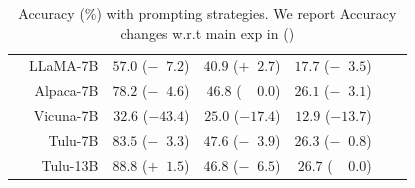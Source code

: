 \documentclass{beamer}
\begin{document}
\begin{frame}
\begin{columns}[t]
\begin{table}
{\begin{tabular}{lrrrrrr}
        & LLaMA-7B            & \cellcolor{'sred'} $57.0$ ($-\;\;7.2$)   & \cellcolor{'sgreen'} $40.9$ ($+\;\;2.7$)   & \cellcolor{'sred'}$17.7$ ($-\;\;3.5$)    \\
        & Alpaca-7B           & \cellcolor{'sred'} $78.2$ ($-\;\;4.6$)   &  $46.8$ ($\;\;\;\;0.0$)                        & \cellcolor{'sred'} $26.1$ ($-\;\;3.1$)    \\
        & Vicuna-7B           & \cellcolor{'sred'} $32.6$ ($-43.4$)  & \cellcolor{'sred'} $25.0$ ($-17.4$)    & \cellcolor{'sred'} $12.9$ ($-13.7$)       \\
        & Tulu-7B             & \cellcolor{'sred'} $83.5$ ($-\;\;3.3$)   & \cellcolor{'sred'} $47.6$ ($-\;\;3.9$)     & \cellcolor{'sred'} $26.3$ ($-\;\;0.8$)   \\ 
        &Tulu-13B             & \cellcolor{'sred'} $88.8$ ($+\;\;1.5$)   & \cellcolor{'sred'} $46.8$ ($-\;\;6.5$)     & $26.7$ ($\;\;\;\;0.0$)   \\
        \bottomrule
        \end{tabular}
        }
        \caption{
        Accuracy (\%) with prompting strategies.
        We report Accuracy changes w.r.t main exp in ()
        }
        \label{tab:prompting}
    \end{table}
\end{columns}
\end{frame}
\end{document}
